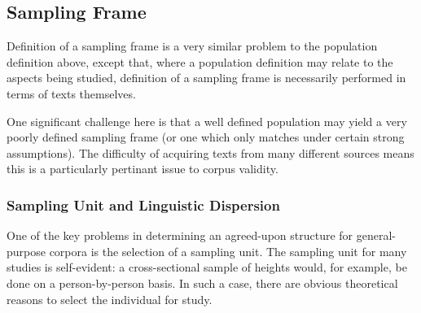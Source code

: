 



% 








\subsection{Sampling Frame}
Definition of a sampling frame is a very similar problem to the population definition above, except that, where a population definition may relate to the aspects being studied, definition of a sampling frame is necessarily performed in terms of texts themselves.

One significant challenge here is that a well defined population may yield a very poorly defined sampling frame (or one which only matches under certain strong assumptions).  The difficulty of acquiring texts from many different sources means this is a particularly pertinant issue to corpus validity.





\subsubsection{Sampling Unit and Linguistic Dispersion}
\label{sec:sampling-unit-and-dispersion}
One of the key problems in determining an agreed-upon structure for general-purpose corpora is the selection of a sampling unit.  The sampling unit for many studies is self-evident: a cross-sectional sample of heights would, for example, be done on a person-by-person basis.  In such a case, there are obvious theoretical reasons to select the individual for study.

